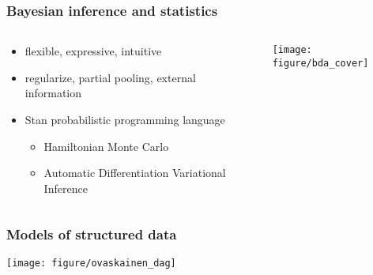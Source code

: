 \documentclass{beamer}
\begin{document}
\begin{frame}
  \frametitle{Bayesian inference and statistics}

  \begin{columns}
    \begin{column}{0.5\textwidth}
      \begin{itemize}
        \item flexible, expressive, intuitive
        \item regularize, partial pooling, external information
        \item Stan probabilistic programming language
          \begin{itemize}
            \item Hamiltonian Monte Carlo
            \item Automatic Differentiation Variational Inference
          \end{itemize}
      \end{itemize}
    \end{column}
    \begin{column}{0.5\textwidth}
      \begin{center}
        \texttt{[image: figure/bda\_cover]}
      \end{center}
    \end{column}
  \end{columns}
\end{frame}

\begin{frame}
  \frametitle{Models of structured data}

  \begin{center}
    \texttt{[image: figure/ovaskainen\_dag]}
  \end{center}

  \tiny{}
\end{frame}

%
\end{document}

